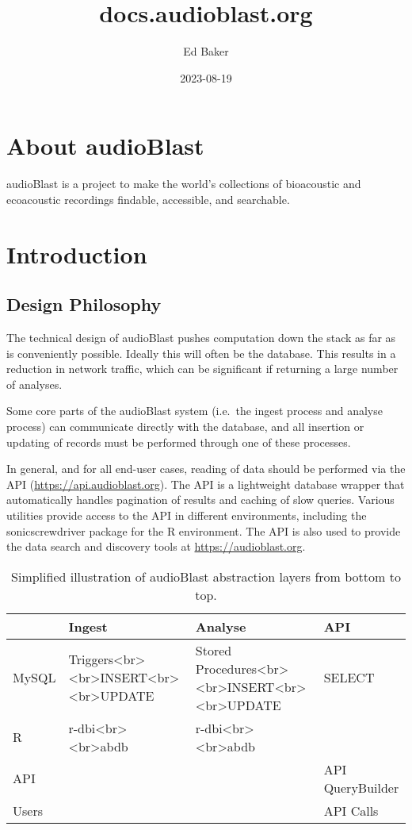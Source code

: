 \documentclass[
]{book}
\title{docs.audioblast.org}
\author{Ed Baker}
\date{2023-08-19}
\begin{document}
\maketitle

{
\setcounter{tocdepth}{1}
\tableofcontents
}
\hypertarget{about-audioblast}{%
\chapter{About audioBlast}\label{about-audioblast}}

audioBlast is a project to make the world's collections of bioacoustic and ecoacoustic recordings findable, accessible, and searchable.

\hypertarget{introduction}{%
\chapter{Introduction}\label{introduction}}

\hypertarget{design-philosophy}{%
\section{Design Philosophy}\label{design-philosophy}}

The technical design of audioBlast pushes computation down the stack as far as is conveniently possible. Ideally this will often be the database. This results in a reduction in network traffic, which can be significant if returning a large number of analyses.

Some core parts of the audioBlast system (i.e.~the ingest process and analyse process) can communicate directly with the database, and all insertion or updating of records must be performed through one of these processes.

In general, and for all end-user cases, reading of data should be performed via the API (\url{https://api.audioblast.org}). The API is a lightweight database wrapper that automatically handles pagination of results and caching of slow queries. Various utilities provide access to the API in different environments, including the sonicscrewdriver package for the R environment. The API is also used to provide the data search and discovery tools at \url{https://audioblast.org}.

\begin{table}

\caption{\label{tab:unnamed-chunk-1}Simplified illustration of audioBlast abstraction layers from 
  bottom to top.}
\centering
\begin{tabular}[t]{llll}
\toprule
  & Ingest & Analyse & API\\
\midrule
MySQL & Triggers<br><br>INSERT<br><br>UPDATE & Stored Procedures<br><br>INSERT<br><br>UPDATE & SELECT\\
R & r-dbi<br><br>abdb & r-dbi<br><br>abdb & \\
API &  &  & API QueryBuilder\\
Users &  &  & API Calls\\
\bottomrule
\end{tabular}
\end{table}
\end{document}
